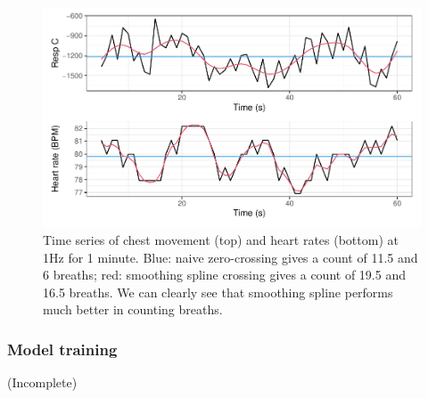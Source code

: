 \documentclass[
]{article}
\begin{document}
\begin{figure}

{\centering \includegraphics{report_files/figure-latex/sszc-1} 

}

\caption{Time series of chest movement (top) and heart rates (bottom) at 1Hz for 1 minute. Blue: naive zero-crossing gives a count of 11.5 and 6 breaths; red: smoothing spline crossing gives a count of 19.5 and 16.5 breaths. We can clearly see that smoothing spline performs much better in counting breaths.}\label{fig:sszc}
\end{figure}

\hypertarget{model-training}{%
\subsubsection{Model training}\label{model-training}}

(Incomplete)
\end{document}
